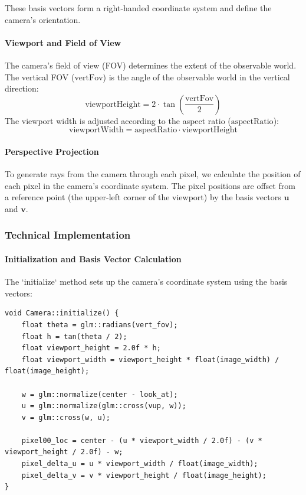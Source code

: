 \documentclass[12pt]{article}
\begin{document}
These basis vectors form a right-handed coordinate system and define the camera's orientation.

\paragraph{Viewport and Field of View}
The camera's field of view (FOV) determines the extent of the observable world. The vertical FOV (\(\text{vertFov}\)) is the angle of the observable world in the vertical direction:
\[
    \text{viewportHeight} = 2 \cdot \tan\left(\frac{\text{vertFov}}{2}\right)
\]
The viewport width is adjusted according to the aspect ratio (\(\text{aspectRatio}\)):
\[
    \text{viewportWidth} = \text{aspectRatio} \cdot \text{viewportHeight}
\]

\paragraph{Perspective Projection}
To generate rays from the camera through each pixel, we calculate the position of each pixel in the camera's coordinate system. The pixel positions are offset from a reference point (the upper-left corner of the viewport) by the basis vectors \(\mathbf{u}\) and \(\mathbf{v}\).

\subsubsection{Technical Implementation}

\paragraph{Initialization and Basis Vector Calculation}
The `initialize` method sets up the camera's coordinate system using the basis vectors:

\begin{verbatim}
void Camera::initialize() {
    float theta = glm::radians(vert_fov);
    float h = tan(theta / 2);
    float viewport_height = 2.0f * h;
    float viewport_width = viewport_height * float(image_width) / float(image_height);

    w = glm::normalize(center - look_at);
    u = glm::normalize(glm::cross(vup, w));
    v = glm::cross(w, u);

    pixel00_loc = center - (u * viewport_width / 2.0f) - (v * viewport_height / 2.0f) - w;
    pixel_delta_u = u * viewport_width / float(image_width);
    pixel_delta_v = v * viewport_height / float(image_height);
}
\end{verbatim}
\end{document}
